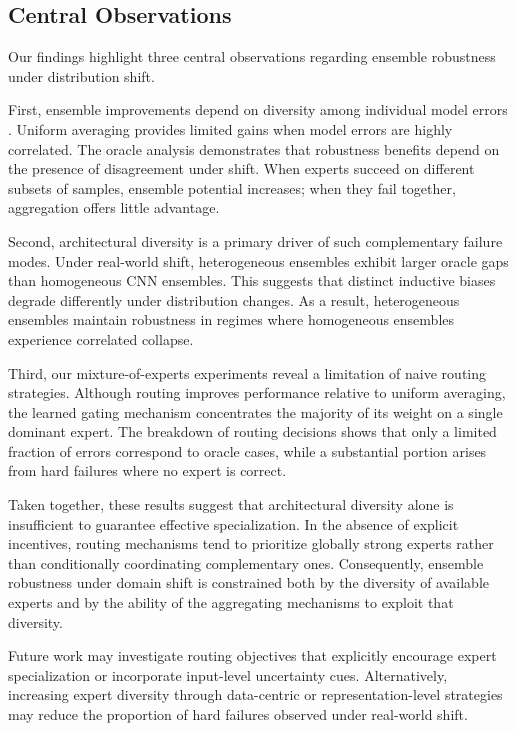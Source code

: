 \subsection{Central Observations}
Our findings highlight three central observations regarding ensemble robustness under distribution shift.

First, ensemble improvements depend on diversity among individual model errors \citep{dietterichEnsembleMethodsMachine2000}.
Uniform averaging provides limited gains when model errors are highly correlated.
The oracle analysis demonstrates that robustness benefits depend on the presence of disagreement under shift.
When experts succeed on different subsets of samples, ensemble potential increases; when they fail together, aggregation offers little advantage.

Second, architectural diversity is a primary driver of such complementary failure modes.
Under real-world shift, heterogeneous ensembles exhibit larger oracle gaps than homogeneous CNN ensembles.
This suggests that distinct inductive biases degrade differently under distribution changes.
As a result, heterogeneous ensembles maintain robustness in regimes where homogeneous ensembles experience correlated collapse.

Third, our mixture-of-experts experiments reveal a limitation of naive routing strategies.
Although routing improves performance relative to uniform averaging, the learned gating mechanism concentrates the majority of its weight on a single dominant expert.
The breakdown of routing decisions shows that only a limited fraction of errors correspond to oracle cases, while a substantial portion arises from hard failures where no expert is correct.

Taken together, these results suggest that architectural diversity alone is insufficient to guarantee effective specialization.
In the absence of explicit incentives, routing mechanisms tend to prioritize globally strong experts rather than conditionally coordinating complementary ones.
Consequently, ensemble robustness under domain shift is constrained both by the diversity of available experts and by the ability of the aggregating mechanisms to exploit that diversity.

Future work may investigate routing objectives that explicitly encourage expert specialization or incorporate input-level uncertainty cues.
Alternatively, increasing expert diversity through data-centric or representation-level strategies may reduce the proportion of hard failures observed under real-world shift.